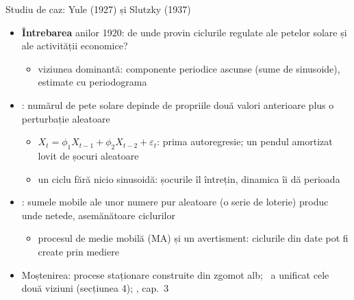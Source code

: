 \begin{frame}{Studiu de caz: Yule (1927) și Slutzky (1937)}
\itemsize{\small}
\begin{itemize}
    \item \textbf{Întrebarea} anilor 1920: de unde provin ciclurile regulate ale petelor solare și ale activității economice?
    \begin{itemize}
        \item viziunea dominantă: componente periodice ascunse (sume de sinusoide), estimate cu periodograma
    \end{itemize}
    \item {}: numărul de pete solare depinde de propriile două valori anterioare plus o perturbație aleatoare
    \begin{itemize}
        \item $X_t = \phi_1X_{t-1} + \phi_2X_{t-2} + \varepsilon_t$: prima autoregresie; un pendul amortizat lovit de șocuri aleatoare
        \item un ciclu fără nicio sinusoidă: șocurile îl întrețin, dinamica îi dă perioada
    \end{itemize}
    \item {}: sumele mobile ale unor numere pur aleatoare (o serie de loterie) produc unde netede, asemănătoare ciclurilor
    \begin{itemize}
        \item procesul de medie mobilă (MA) și un avertisment: ciclurile din date pot fi create prin mediere
    \end{itemize}
    \item Moștenirea: procese staționare construite din zgomot alb; \ a unificat cele două viziuni (secțiunea 4); , cap.~3
\end{itemize}
\end{frame}


